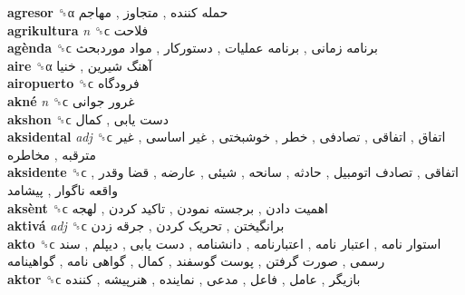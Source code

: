 \textbf{agresor} ␝α   حمله کننده ,  متجاوز ,  مهاجم   \\
\textbf{agrikultura} \emph{n}  ␝ϲ   فلاحت   \\
\textbf{agènda} ␝ϲ   برنامه زمانی ,  برنامه عملیات ,  دستورکار ,  مواد موردبحث   \\
\textbf{aire} ␝α   آهنگ شیرین ,  خنیا   \\
\textbf{airopuerto} ␝ϲ   فرودگاه   \\
\textbf{akné} \emph{n}  ␝ϲ   غرور جوانی   \\
\textbf{akshon} ␝ϲ   دست یابی ,  کمال   \\
\textbf{aksidental} \emph{adj}  ␝ϲ   اتفاق ,  اتفاقی ,  تصادفی ,  خطر ,  خوشبختی ,  غیر اساسی ,  غیر مترقبه ,  مخاطره   \\
\textbf{aksidente} ␝ϲ   اتفاقی ,  تصادف اتومبیل ,  حادثه ,  سانحه ,  شیئی ,  عارضه ,  قضا وقدر ,  واقعه ناگوار ,  پیشامد   \\
\textbf{aksènt} ␝ϲ   اهمیت دادن ,  برجسته نمودن ,  تاکید کردن ,  لهجه   \\
\textbf{aktivá} \emph{adj}  ␝ϲ   برانگیختن ,  تحریک کردن ,  جرقه زدن   \\
\textbf{akto} ␝ϲ   استوار نامه ,  اعتبار نامه ,  اعتبارنامه ,  دانشنامه ,  دست یابی ,  دیپلم ,  سند رسمی ,  صورت گرفتن ,  پوست گوسفند ,  کمال ,  گواهی نامه ,  گواهینامه   \\
\textbf{aktor} ␝ϲ   بازیگر ,  عامل ,  فاعل ,  مدعی ,  نماینده ,  هنرپیشه ,  کننده   \\
